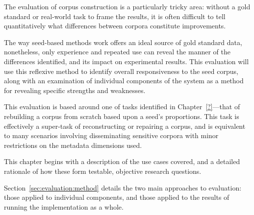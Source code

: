 
The evaluation of corpus construction is a particularly tricky area: without a gold standard or real-world task to frame the results, it is often difficult to tell quantitatively what differences between corpora constitute improvements.


The way seed-based methods work offers an ideal source of gold standard data, nonetheless, only experience and repeated use can reveal the manner of the differences identified, and its impact on experimental results.  This evaluation will use this reflexive method to identify overall responsiveness to the seed corpus, along with an examination of individual components of the system as a method for revealing specific strengths and weaknesses.

This evaluation is based around one of tasks identified in Chapter~\ref{?}---that of rebuilding a corpus from scratch based upon a seed's proportions.  This task is effectively a super-task of reconstructing or repairing a corpus, and is equivalent to many scenarios involving disseminating sensitive corpora with minor restrictions on the metadata dimensions used.



This chapter begins with a description of the use cases covered, and a detailed rationale of how these form testable, objective research questions.

Section~\ref{sec:evaluation:method} details the two main approaches to evaluation: those applied to individual components, and those applied to the results of running the implementation as a whole.








